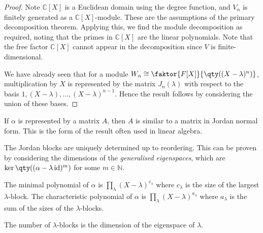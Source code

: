 \begin{proof}
	Note $\mathbb C[X]$ is a Euclidean domain using the degree function, and $V_\alpha$ is finitely generated as a $\mathbb C[X]$-module.
	These are the assumptions of the primary decomposition theorem.
	Applying this, we find the module decomposition as required, noting that the primes in $\mathbb C[X]$ are the linear polynomials.
	Note that the free factor $\mathbb C[X]$ cannot appear in the decomposition since $V$ is finite-dimensional.

	We have already seen that for a module $W_\alpha \cong \faktor{F[X]}{\qty((X-\lambda)^n)}$, multiplication by $X$ is represented by the matrix $J_n(\lambda)$ with respect to the basis $1, (X-\lambda), \dots, (X-\lambda)^{n-1}$.
	Hence the result follows by considering the union of these bases.
\end{proof}
\begin{remark}
	If $\alpha$ is represented by a matrix $A$, then $A$ is similar to a matrix in Jordan normal form.
	This is the form of the result often used in linear algebra.

	The Jordan blocks are uniquely determined up to reordering.
	This can be proven by considering the dimensions of the \textit{generalised eigenspaces}, which are $\ker\qty((\alpha - \lambda \id)^m)$ for some $m \in \mathbb N$.

	The minimal polynomial of $\alpha$ is $\prod_{\lambda} (X-\lambda)^{c_\lambda}$ where $c_\lambda$ is the size of the largest $\lambda$-block.
	The characteristic polynomial of $\alpha$ is $\prod_{\lambda} (X-\lambda)^{a_\lambda}$ where $a_\lambda$ is the sum of the sizes of the $\lambda$-blocks.

	The number of $\lambda$-blocks is the dimension of the eigenspace of $\lambda$.
\end{remark}

